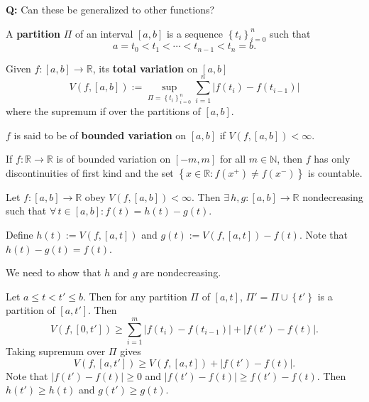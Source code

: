 \documentclass{notes}
\begin{document}
  {\boldmath \bfseries  Q:} Can these be generalized to other functions?

  \begin{defn}
    A {\boldmath \bfseries partition} $\Pi$ of an interval $[a, b]$ is a sequence $\left \{ t_i \right \}_{i = 0}^n$ such that 
    \[
      a = t_0 < t_{1} < \cdots < t_{n - 1} < t_n = b.
    \]
  \end{defn}
  
  \begin{defn}
    Given $f \colon [a, b] \to \mathbb R$, its {\boldmath \bfseries total variation} on $[a, b]$
    \[
      V(f, [a, b]) := \sup_{\Pi = \left \{ t_i \right \}_{i = 0}^n} \sum_{i = 1}^n \left | f(t_i) - f(t_{i - 1}) \right | 
    \]
    where the supremum if over the partitions of $[a, b]$.
  \end{defn}
  
  \begin{defn}
    $f$ is said to be of {\boldmath \bfseries bounded variation} on $[a, b]$ if $V(f, [a, b]) < \infty$.
  \end{defn}
  
  \begin{lem}
    If $f \colon \mathbb R \to \mathbb R$ is of bounded variation on $[-m, m]$ for all $m \in \mathbb N$, then $f$ has only discontinuities of first kind and the set $\left \{ x \in \mathbb R : f(x^+) \neq f(x^-) \right \}$ is countable.
  \end{lem}
  
  \begin{thm}
    Let $f \colon [a, b] \to \mathbb R$ obey $V(f, [a, b]) < \infty$.
    Then $\exists \, h, g \colon [a, b] \to \mathbb R$ nondecreasing such that $\forall \, t \in [a, b]: f(t) = h(t) - g(t)$.
  \end{thm}
  
  \begin{prf}
    Define $h(t) := V(f, [a, t])$ and $g(t) := V(f, [a, t]) - f(t)$.
    Note that $h(t) - g(t) = f(t)$.

    We need to show that $h$ and $g$ are nondecreasing.
    
    Let $a \leq t < t' \leq b$.
    Then for any partition $\Pi$ of $[a, t]$, $\Pi' = \Pi \cup \left \{ t' \right \}$ is a partition of $[a, t']$.
    Then 
    \[
      V(f, [0, t']) \geq \sum_{i = 1}^m \left | f(t_i) - f(t_{i - 1}) \right | + \left | f(t') - f(t) \right |.
    \]
    Taking supremum over $\Pi$ gives 
    \[
      V(f, [a, t']) \geq V(f, [a, t]) + \left | f(t') - f(t) \right |.
    \]
    Note that $\left | f(t') - f(t) \right | \geq 0$ and $\left | f(t') - f(t) \right | \geq f(t') - f(t)$.
    Then $h(t') \geq h(t)$ and $g(t') \geq g(t)$.
  \end{prf}
  
\end{document}
